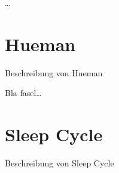 \ldots

\section{Hueman}
\label{ch:Apps:sec:Hueman}

Beschreibung von Hueman

Bla fasel\ldots

\section{Sleep Cycle}
\label{ch:Apps:sec:SleepCycle}

Beschreibung von Sleep Cycle


